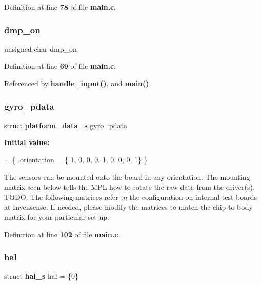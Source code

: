 Definition at line \textbf{ 78} of file \textbf{ main.\+c}.

\mbox{\label{group__eMPL_ga49fb51079238683b21264827348b5968}} 
\subsubsection{dmp\+\_\+on}
{\footnotesize\ttfamily unsigned char dmp\+\_\+on}



Definition at line \textbf{ 69} of file \textbf{ main.\+c}.



Referenced by \textbf{ handle\+\_\+input()}, and \textbf{ main()}.

\mbox{\label{group__eMPL_ga6baed579bec05b70f94fb3b420c7f27a}} 
\subsubsection{gyro\+\_\+pdata}
{\footnotesize\ttfamily struct \textbf{ platform\+\_\+data\+\_\+s} gyro\+\_\+pdata\hspace{0.3cm}{\ttfamily [static]}}

{\bfseries Initial value\+:}
\begin{DoxyCode}
= \{
    .orientation = \{ 1, 0, 0,
                     0, 1, 0,
                     0, 0, 1\}
\}
\end{DoxyCode}
The sensors can be mounted onto the board in any orientation. The mounting matrix seen below tells the M\+PL how to rotate the raw data from the driver(s). T\+O\+DO\+: The following matrices refer to the configuration on internal test boards at Invensense. If needed, please modify the matrices to match the chip-\/to-\/body matrix for your particular set up. 

Definition at line \textbf{ 102} of file \textbf{ main.\+c}.

\mbox{\label{group__eMPL_ga3cb1077f30b35eae5e6f9eb104179ec2}} 
\subsubsection{hal}
{\footnotesize\ttfamily struct \textbf{ hal\+\_\+s} hal = \{0\}\hspace{0.3cm}{\ttfamily [static]}}



